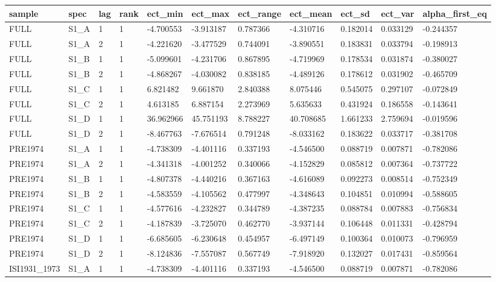 \begin{tabular}{lllllllllll}
\hline
sample & spec & lag & rank & ect\_min & ect\_max & ect\_range & ect\_mean & ect\_sd & ect\_var & alpha\_first\_eq \\
\hline
FULL & S1\_A & 1 & 1 & -4.700553 & -3.913187 & 0.787366 & -4.310716 & 0.182014 & 0.033129 & -0.244357 \\
FULL & S1\_A & 2 & 1 & -4.221620 & -3.477529 & 0.744091 & -3.890551 & 0.183831 & 0.033794 & -0.198913 \\
FULL & S1\_B & 1 & 1 & -5.099601 & -4.231706 & 0.867895 & -4.719969 & 0.178534 & 0.031874 & -0.380027 \\
FULL & S1\_B & 2 & 1 & -4.868267 & -4.030082 & 0.838185 & -4.489126 & 0.178612 & 0.031902 & -0.465709 \\
FULL & S1\_C & 1 & 1 & 6.821482 & 9.661870 & 2.840388 & 8.075446 & 0.545075 & 0.297107 & -0.072849 \\
FULL & S1\_C & 2 & 1 & 4.613185 & 6.887154 & 2.273969 & 5.635633 & 0.431924 & 0.186558 & -0.143641 \\
FULL & S1\_D & 1 & 1 & 36.962966 & 45.751193 & 8.788227 & 40.708685 & 1.661233 & 2.759694 & -0.019596 \\
FULL & S1\_D & 2 & 1 & -8.467763 & -7.676514 & 0.791248 & -8.033162 & 0.183622 & 0.033717 & -0.381708 \\
PRE1974 & S1\_A & 1 & 1 & -4.738309 & -4.401116 & 0.337193 & -4.546500 & 0.088719 & 0.007871 & -0.782086 \\
PRE1974 & S1\_A & 2 & 1 & -4.341318 & -4.001252 & 0.340066 & -4.152829 & 0.085812 & 0.007364 & -0.737722 \\
PRE1974 & S1\_B & 1 & 1 & -4.807378 & -4.440216 & 0.367163 & -4.616089 & 0.092273 & 0.008514 & -0.752349 \\
PRE1974 & S1\_B & 2 & 1 & -4.583559 & -4.105562 & 0.477997 & -4.348643 & 0.104851 & 0.010994 & -0.588605 \\
PRE1974 & S1\_C & 1 & 1 & -4.577616 & -4.232827 & 0.344789 & -4.387235 & 0.088784 & 0.007883 & -0.756834 \\
PRE1974 & S1\_C & 2 & 1 & -4.187839 & -3.725070 & 0.462770 & -3.937144 & 0.106448 & 0.011331 & -0.428794 \\
PRE1974 & S1\_D & 1 & 1 & -6.685605 & -6.230648 & 0.454957 & -6.497149 & 0.100364 & 0.010073 & -0.796959 \\
PRE1974 & S1\_D & 2 & 1 & -8.124836 & -7.557087 & 0.567749 & -7.918920 & 0.132027 & 0.017431 & -0.859564 \\
ISI1931\_1973 & S1\_A & 1 & 1 & -4.738309 & -4.401116 & 0.337193 & -4.546500 & 0.088719 & 0.007871 & -0.782086 \\

\end{tabular}

